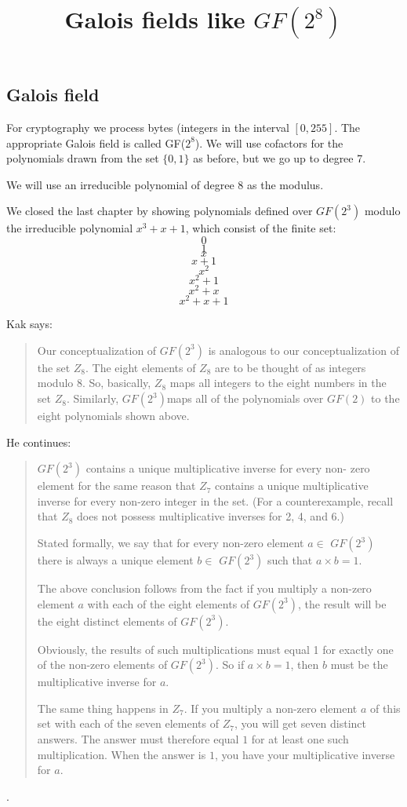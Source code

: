 \documentclass[11pt, oneside]{article}
\title{Galois fields like $GF(2^8)$}
\date{}
\begin{document}
\maketitle

\Large

\subsection*{Galois field}

For cryptography we process bytes (integers in the interval $[0,255]$.  The appropriate Galois field is called GF($2^8$).  We will use cofactors for the polynomials drawn from the set $\{0,1\}$ as before, but we go up to degree 7.

We will use an irreducible polynomial of degree 8 as the modulus.

We closed the last chapter by showing polynomials defined over $GF(2^3)$ modulo the irreducible polynomial $x^3 + x + 1$, which consist of the finite set:
\[ 0 \]
\[ 1 \]
\[ x \]
\[ x + 1 \]
\[ x^2 \]
\[ x^2 + 1 \]
\[ x^2 + x \]
\[ x^2 + x + 1 \]


Kak says:

\begin{quote} Our conceptualization of $GF(2^3)$ is analogous to our conceptualization of the set $Z_8$. The eight elements of $Z_8$ are to be thought of as integers modulo 8. So, basically, $Z_8$ maps all integers to the eight numbers in the set $Z_8$. Similarly, $GF(2^3)$maps all of the polynomials over $GF(2)$ to the eight polynomials shown above.\end{quote}

He continues:

\begin{quote}$GF(2^3)$ contains a unique multiplicative inverse for every non- zero element for the same reason that $Z_7$ contains a unique multiplicative inverse for every non-zero integer in the set. (For a counterexample, recall that $Z_8$ does not possess multiplicative inverses for 2, 4, and 6.) 

Stated formally, we say that for every non-zero element $a \in$ $GF(2^3)$ there is always a unique element $b \in$ $GF(2^3)$ such that $a \times b = 1$.

The above conclusion follows from the fact if you multiply a non-zero element $a$ with each of the eight elements of $GF(2^3)$, the result will be the eight distinct elements of $GF(2^3)$. 

Obviously, the results of such multiplications must equal 1 for exactly one of the non-zero elements of $GF(2^3)$. So if $a \times b = 1$, then $b$ must be the multiplicative inverse for $a$.

The same thing happens in $Z_7$. If you multiply a non-zero element $a$ of this set with each of the seven elements of $Z_7$, you will get seven distinct answers. The answer must therefore equal $1$ for at least one such multiplication. When the answer is $1$, you have your multiplicative inverse for $a$.\end{quote}.
\end{document}
